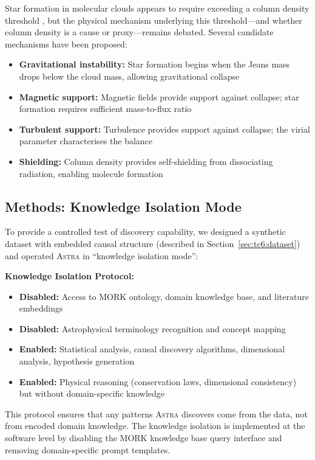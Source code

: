 \documentclass[usenatbib]{rasti}
\newcommand{\astra}{\textsc{Astra}\xspace}
\begin{document}
Star formation in molecular clouds appears to require exceeding a column density threshold \citep{Andre2010}, but the physical mechanism underlying this threshold---and whether column density is a cause or proxy---remains debated.
Several candidate mechanisms have been proposed:
\begin{itemize}
  \item \textbf{Gravitational instability:} Star formation begins when the Jeans mass drops below the cloud mass, allowing gravitational collapse
  \item \textbf{Magnetic support:} Magnetic fields provide support against collapse; star formation requires sufficient mass-to-flux ratio
  \item \textbf{Turbulent support:} Turbulence provides support against collapse; the virial parameter characterises the balance
  \item \textbf{Shielding:} Column density provides self-shielding from dissociating radiation, enabling molecule formation
\end{itemize}

\subsection{Methods: Knowledge Isolation Mode}
\label{sec:tc6:methods}

To provide a controlled test of discovery capability, we designed a synthetic dataset with embedded causal structure (described in Section~\ref{sec:tc6:dataset}) and operated \astra in ``knowledge isolation mode'':

\textbf{Knowledge Isolation Protocol:}
\begin{itemize}
  \item \textbf{Disabled:} Access to MORK ontology, domain knowledge base, and literature embeddings
  \item \textbf{Disabled:} Astrophysical terminology recognition and concept mapping
  \item \textbf{Enabled:} Statistical analysis, causal discovery algorithms, dimensional analysis, hypothesis generation
  \item \textbf{Enabled:} Physical reasoning (conservation laws, dimensional consistency) but without domain-specific knowledge
\end{itemize}

This protocol ensures that any patterns \astra discovers come from the data, not from encoded domain knowledge.
The knowledge isolation is implemented at the software level by disabling the MORK knowledge base query interface and removing domain-specific prompt templates.
\end{document}
